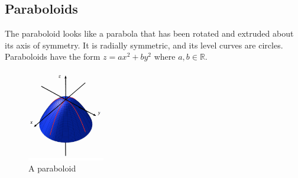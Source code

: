 \subsection{Paraboloids}
\noindent
The paraboloid looks like a parabola that has been rotated and extruded about its axis of symmetry.
It is radially symmetric, and its level curves are circles.
Paraboloids have the form $z = ax^2 + by^2$ where $a,b \in \mathbb{R}$.

\begin{figure}[H]
	\centering
	\includegraphics[width = 0.3\textwidth]{./Images/differentialMultivariableCalculus/paraboloid.png}
	\caption{A paraboloid}
\end{figure}